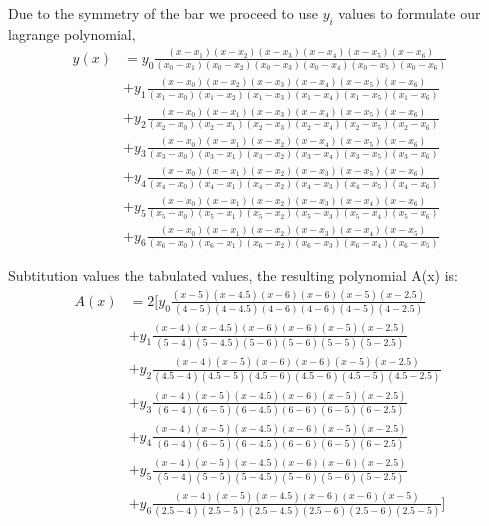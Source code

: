 \documentclass[a4paper]{memoir}
\begin{document}
Due to the symmetry of the bar we proceed to use $y_i$ values to formulate our lagrange polynomial,
\begin{equation}
	\begin{split}
		y(x) &= y_0 \frac{(x-x_1)(x-x_2)(x-x_3)(x-x_4)(x-x_5)(x-x_6)}{(x_0-x_1)(x_0-x_2)(x_0-x_3)(x_0-x_4)(x_0-x_5)(x_0-x_6)} \\
					&+ y_1 \frac{(x-x_0)(x-x_2)(x-x_3)(x-x_4)(x-x_5)(x-x_6)}{(x_1-x_0)(x_1-x_2)(x_1-x_3)(x_1-x_4)(x_1-x_5)(x_1-x_6)} \\
					&+ y_2 \frac{(x-x_0)(x-x_1)(x-x_3)(x-x_4)(x-x_5)(x-x_6)}{(x_2-x_0)(x_2-x_1)(x_2-x_3)(x_2-x_4)(x_2-x_5)(x_2-x_6)} \\
					&+ y_3 \frac{(x-x_0)(x-x_1)(x-x_2)(x-x_4)(x-x_5)(x-x_6)}{(x_3-x_0)(x_3-x_1)(x_3-x_2)(x_3-x_4)(x_3-x_5)(x_3-x_6)} \\
					&+ y_4 \frac{(x-x_0)(x-x_1)(x-x_2)(x-x_3)(x-x_5)(x-x_6)}{(x_4-x_0)(x_4-x_1)(x_4-x_2)(x_4-x_3)(x_4-x_5)(x_4-x_6)} \\
					&+ y_5 \frac{(x-x_0)(x-x_1)(x-x_2)(x-x_3)(x-x_4)(x-x_6)}{(x_5-x_0)(x_5-x_1)(x_5-x_2)(x_5-x_3)(x_5-x_4)(x_5-x_6)} \\
					&+ y_6 \frac{(x-x_0)(x-x_1)(x-x_2)(x-x_3)(x-x_4)(x-x_5)}{(x_6-x_0)(x_6-x_1)(x_6-x_2)(x_6-x_3)(x_6-x_4)(x_6-x_5)} 
	\end{split}
\end{equation}

Subtitution values the tabulated values, the resulting polynomial A(x) is:
\begin{equation}
	\begin{split}
A(x) &= 2 [ y_0 \frac{(x-5)(x-4.5)(x-6)(x-6)(x-5)(x-2.5)}{(4-5)(4-4.5)(4-6)(4-6)(4-5)(4-2.5)} \\
					&+ y_1 \frac{(x-4)(x-4.5)(x-6)(x-6)(x-5)(x-2.5)}{(5-4)(5-4.5)(5-6)(5-6)(5-5)(5-2.5)} \\
					&+ y_2 \frac{(x-4)(x-5)(x-6)(x-6)(x-5)(x-2.5)}{(4.5-4)(4.5-5)(4.5-6)(4.5-6)(4.5-5)(4.5-2.5)} \\
					&+ y_3 \frac{(x-4)(x-5)(x-4.5)(x-6)(x-5)(x-2.5)}{(6-4)(6-5)(6-4.5)(6-6)(6-5)(6-2.5)} \\
					&+ y_4 \frac{(x-4)(x-5)(x-4.5)(x-6)(x-5)(x-2.5)}{(6-4)(6-5)(6-4.5)(6-6)(6-5)(6-2.5)} \\
					&+ y_5 \frac{(x-4)(x-5)(x-4.5)(x-6)(x-6)(x-2.5)}{(5-4)(5-5)(5-4.5)(5-6)(5-6)(5-2.5)} \\
					&+ y_6 \frac{(x-4)(x-5)(x-4.5)(x-6)(x-6)(x-5)}{(2.5-4)(2.5-5)(2.5-4.5)(2.5-6)(2.5-6)(2.5-5)} ]
	\end{split}
\end{equation}
\end{document}
